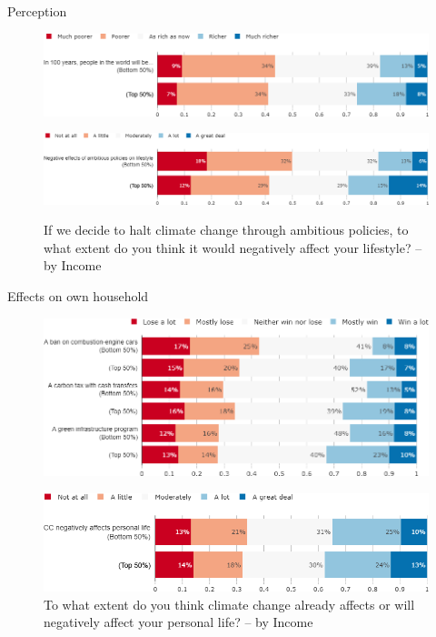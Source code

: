 \documentclass[aspectratio=169,9pt,dvipsnames]{beamer}
\begin{document}
\begin{frame}{Perception}%
\vspace{-.5cm}
\begin{figure}[h!]
\caption{Do you think that overall people in the world will be richer or poorer in 100 years from now? -– by Income}
\includegraphics[width=.7\textwidth]{../figures/US/future_richness_US_inc.png} \\
\vspace{.5cm}
\caption{If we decide to halt climate change through ambitious policies, to what extent do you think it would negatively affect your lifestyle? -- by Income}
\includegraphics[width=.7\textwidth]{../figures/US/effect_halt_CC_lifestyle_US_inc.png} \\
\end{figure}
\end{frame}

\begin{frame}{Effects on own household}%
\begin{figure}[h!]
\caption{Do you think that financially your household would win or lose from the following policy? -- by Income}
\includegraphics[width=.6\textwidth]{../figures/US/policies_win_lose_self_US_inc.png} \\
\vspace{.1cm}
\caption{To what extent do you think climate change already affects or will negatively affect your personal life? -- by Income}
\includegraphics[width=.5\textwidth]{../figures/US/CC_affects_self_US_inc.png}
\end{figure}
\end{frame}
\end{document}
